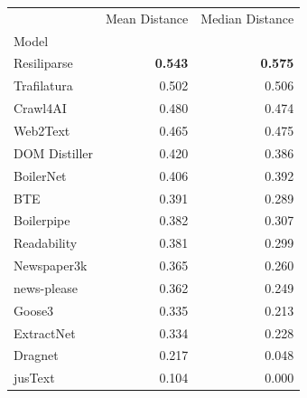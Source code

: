 \begin{tabular}{lrr}
 & Mean Distance & Median Distance \\
Model &  &  \\
Resiliparse & \bf 0.543 & \bf 0.575 \\
Trafilatura & 0.502 & 0.506 \\
Crawl4AI & 0.480 & 0.474 \\
Web2Text & 0.465 & 0.475 \\
DOM Distiller & 0.420 & 0.386 \\
BoilerNet & 0.406 & 0.392 \\
BTE & 0.391 & 0.289 \\
Boilerpipe & 0.382 & 0.307 \\
Readability & 0.381 & 0.299 \\
Newspaper3k & 0.365 & 0.260 \\
news-please & 0.362 & 0.249 \\
Goose3 & 0.335 & 0.213 \\
ExtractNet & 0.334 & 0.228 \\
Dragnet & 0.217 & 0.048 \\
jusText & 0.104 & 0.000 \\
\end{tabular}
